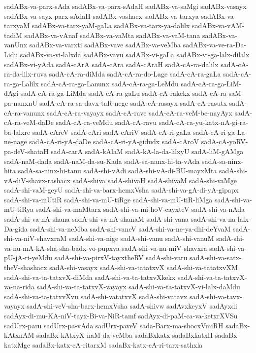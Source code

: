 {sadABx-va-parx-sAda
sadABx-va-parx-sAdaH
sadABx-va-saMgi
sadABx-vasayx
sadABx-va-sayx-parx-sAdaH
sadABx-vashacx
sadABx-va-tarxya
sadABx-va-tarxyaM
sadABx-va-tarx-yaM-gaLa
sadABx-va-tarx-ya-dalilx
sadABx-va-vAM-tadiM
sadABx-va-vAnaf
sadABx-va-vaMta
sadABx-va-vaM-tana
sadABx-va-vanUnx
sadABx-va-varxti
sadABx-vave
sadABx-va-veMba
sadABx-va-ve-ra-Da-Lidu
sadABx-va-vi-lalxda
sadABx-vavu
sadABx-vi-gaLa
sadABx-vi-ga-lalx-dilalx
sadABx-vi-yAda
sadA-cArA
sadA-cAra
sadA-cAraH
sadA-cA-ra-dalilx
sadA-cA-ra-da-lilx-ruva
sadA-cA-ra-diMda
sadA-cA-ra-do-Lage
sadA-cA-ra-gaLa
sadA-cA-ra-ga-Lalilx
sadA-cA-ra-ga-Lanunx
sadA-cA-ra-ga-LeMdu
sadA-cA-ra-ga-LiM-dAgi
sadA-cA-ra-ga-LiMda
sadA-cA-ra-gaLu
sadA-cA-rakekx
sadA-cA-ra-saM-pa-nanxnU
sadA-cA-ra-sa-davx-taR-nege
sadA-cA-rasayx
sadA-cA-rasutx
sadA-cA-ra-vanunx
sadA-cA-ra-vayayx
sadA-cA-rave
sadA-cA-ra-veM-be-nayAyx
sadA-cA-ra-veM-daDe
sadA-cA-ra-veMdu
sadA-cA-ravu
sadA-cA-ra-yu-katx-nA-gi-ra-ba-lalxre
sadA-cAreV
sadA-cAri
sadA-cAriV
sadA-cA-ri-gaLa
sadA-cA-ri-ga-La-ne-nage
sadA-cA-ri-yA-daDe
sadA-cA-ri-yA-gidudx
sadA-cAroV
sadA-cA-yoRV-pa-deV-shataH
sadA-carA
sadA-kAlaM
sadA-kA-la-da-lilxyU
sadA-liM-gAMga
sadA-naM-dada
sadA-naM-da-su-Kada
sadA-sa-nanx-hi-ta-vAda
sadA-sa-ninx-hita
sadA-sa-ninx-hi-tanu
sadA-shi-vAdi
sadA-shi-vA-di-BU-mayxMta
sadA-shi-vA-diV-shavx-rashacx
sadA-shiva
sadA-shivaH
sadA-shivaM
sadA-shi-vaMge
sadA-shi-vaM-geyU
sadA-shi-va-barx-hemxVsha
sadA-shi-va-gA-di-yA-gipapx
sadA-shi-va-mUtiR
sadA-shi-va-mU-tiRge
sadA-shi-va-mU-tiR-liMga
sadA-shi-va-mU-tiRya
sadA-shi-va-maMtarx
sadA-shi-va-mi-hoV-cayxteV
sadA-shi-va-nAda
sadA-shi-va-nA-shana
sadA-shi-va-nA-shanaM
sadA-shi-vana
sadA-shi-va-na-lalx-Da-gida
sadA-shi-va-neMba
sadA-shi-vaneV
sadA-shi-va-ne-ya-dhi-deYvaM
sadA-shi-va-niV-shavxraM
sadA-shi-va-nige
sadA-shi-vanu
sadA-shi-vanuM
sadA-shi-va-nu-mA-kA-sha-sha-badx-vo-pupxva
sadA-shi-va-nu-miV-shavxra
sadA-shi-va-pU-jA-ri-yeMdu
sadA-shi-va-pirxV-tayxtheRV
sadA-shi-varu
sadA-shi-va-satx-theV-shashacx
sadA-shi-vasayx
sadA-shi-va-tatatxvX
sadA-shi-va-tatatxvXM
sadA-shi-va-ta-tatxvX-diMda
sadA-shi-va-ta-tatxvXkekx
sadA-shi-va-ta-tatxvX-va-na-rida
sadA-shi-va-ta-tatxvX-vayayx
sadA-shi-va-ta-tatxvX-vi-lalx-daMdu
sadA-shi-va-ta-tatxvXvu
sadA-shi-vatatxvX
sadA-shi-vatavx
sadA-shi-va-tavx-vayayx
sadA-shi-veV-sha-barx-hemxVsha
sadA-shivw
sadAvxkeyxV
sadAyxdi
sadAyx-di-mu-KA-niV-tayx-Bi-va-NiR-tamf
sadAyx-di-paM-ca-va-ketxrXVSu
sadUrx-paru
sadUrx-pa-vAda
sadUrx-paveV
sada-Barx-ma-shocxVmiRH
sadaBx-kAtxnAM
sadaBx-kAtxyX-naM-da-veMba
sadaBxkatx
sadaBxkatxH
sadaBx-katxMge
sadaBx-katx-cA-ritarxM
sadaBx-katx-cA-ri-tarx-sathxla
}
